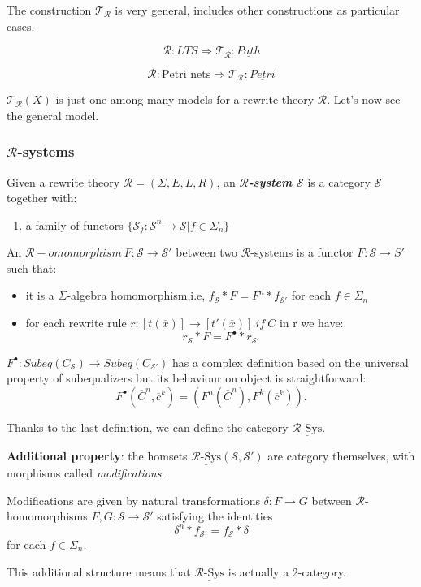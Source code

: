 \documentclass{beamer}
\begin{document}
\begin{frame}
    The construction $\mathcal{T_R}$ is very general, includes other constructions as particular cases.

    \pause
   
    $$\mathcal{R} : LTS \Rightarrow  \mathcal{T_R} : \underline{Path}$$

    \pause
    
    $$\mathcal{R} : \text{Petri nets} \Rightarrow  \mathcal{T_R} : \underline{Petri}$$

    \bigskip 
    \pause
$\mathcal{T_R}(X)$ is just one among many models for a rewrite theory $\mathcal{R}.$ Let's now see the general model.
\end{frame}
\begin{frame}
    \frametitle{$\mathcal{R}$-systems}
    \scriptsize
    Given a rewrite theory $\mathcal{R} = (\Sigma,E,L,R)$, an \emph{\textbf{$\mathcal{R}$-system $\mathcal{S}$}} is a 
    category $\mathcal{S}$ together with:
    \begin{enumerate}
        \item a family of functors $\{\mathcal{S}_f:\mathcal{S}^n \rightarrow \mathcal{S} | f \in \Sigma_n\}$
    \end{enumerate}
\end{frame}
\begin{frame}
    \scriptsize
    An $\mathcal{R}-omomorphism\ F: \mathcal{S} \rightarrow \mathcal{S}'$ between two $\mathcal{R}$-systems is a 
    functor $F:\mathcal{S} \rightarrow S'$ such that:
    \begin{itemize}
        \item it is a $\Sigma$-algebra homomorphism,i.e, $f_\mathcal{S}*F = F^n*f_{\mathcal{S}'}$ for each $f \in \Sigma_n$
        \item for each rewrite rule $r:[t(\overline{x})] \rightarrow [t'(\overline{x})]\ if\ C$ in r we have: 
        $$ r_\mathcal{S} * F = F^\bullet * r_{\mathcal{S}'} $$
    \end{itemize}
    $F^\bullet:Subeq(C_\mathcal{S}) \rightarrow Subeq(C_{\mathcal{S}'})$ has  a complex definition based on the universal property of subequalizers 
    but its behaviour on object is straightforward: 
    $$F^\bullet(\overline{C}^n,\overline{c}^k) = (F^n(\overline{C}^n),F^k(\overline{c}^k)). $$

 
    \pause 
    Thanks to the last definition, we can define the category $\underline{\mathcal{R}\text{-Sys}}$. 

    \medskip
    \pause
    \textbf{Additional property}: the homsets $\underline{\mathcal{R}\text{-Sys}}(\mathcal{S},\mathcal{S}')$ are 
    category themselves, with morphisms called \emph{modifications}.

    Modifications are given by natural transformations $\delta: F \rightarrow G$ between $\mathcal{R}$-homomorphisms 
    $F,G:\mathcal{S} \rightarrow \mathcal{S}'$ satisfying the identities
    $$\delta^n * f_{\mathcal{S}'} =  f_\mathcal{S} * \delta$$
    for each $f \in \Sigma_n$. 

    \medskip
    \pause
    This additional structure means that $\underline{\mathcal{R}\text{-Sys}}$ is actually a 2-category.
\end{frame}
\end{document}
